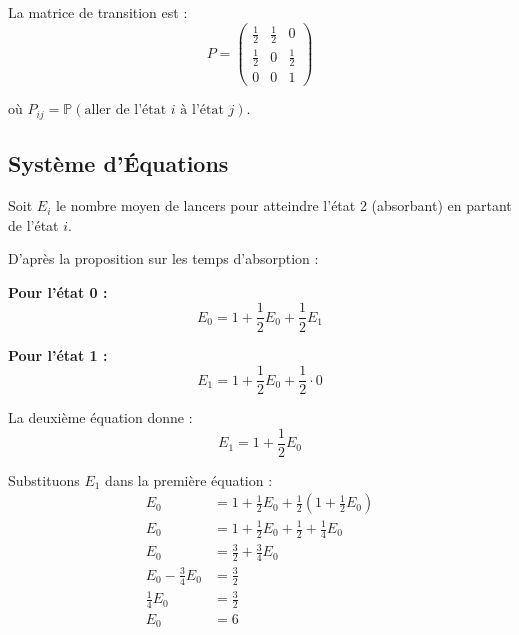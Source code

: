 La matrice de transition est :
\[
P = \begin{pmatrix}
\frac{1}{2} & \frac{1}{2} & 0 \\
\frac{1}{2} & 0 & \frac{1}{2} \\
0 & 0 & 1
\end{pmatrix}
\]

où $P_{ij} = \mathbb{P}(\text{aller de l'état } i \text{ à l'état } j)$.

\begin{center}
\end{center}

\subsection*{Système d'Équations}

Soit $E_i$ le nombre moyen de lancers pour atteindre l'état 2 (absorbant) en partant de l'état $i$.

D'après la proposition sur les temps d'absorption :

\textbf{Pour l'état 0 :}
\[
E_0 = 1 + \frac{1}{2} E_0 + \frac{1}{2} E_1
\]

\textbf{Pour l'état 1 :}
\[
E_1 = 1 + \frac{1}{2} E_0 + \frac{1}{2} \cdot 0
\]

La deuxième équation donne :
\[
E_1 = 1 + \frac{1}{2} E_0
\]


Substituons $E_1$ dans la première équation :
\begin{align*}
E_0 &= 1 + \frac{1}{2} E_0 + \frac{1}{2}\left(1 + \frac{1}{2} E_0\right) \\
E_0 &= 1 + \frac{1}{2} E_0 + \frac{1}{2} + \frac{1}{4} E_0 \\
E_0 &= \frac{3}{2} + \frac{3}{4} E_0 \\
E_0 - \frac{3}{4} E_0 &= \frac{3}{2} \\
\frac{1}{4} E_0 &= \frac{3}{2} \\
E_0 &= 6
\end{align*}


